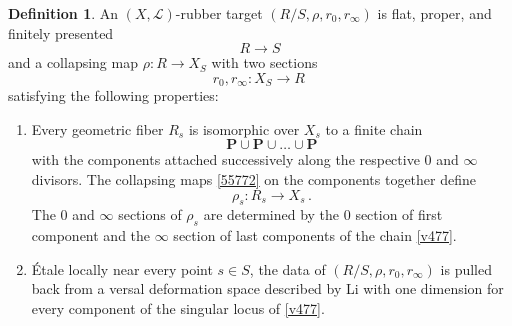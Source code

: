 \documentclass[a4paper,12pt]{article} %
\newcommand{\ca}[1]{{\mathcal{#1}}}
\theoremstyle{definition}
\newtheorem{definition}{Definition} %
\theoremstyle{plain}%
\begin{document}
\begin{definition}\label{def:rubber_target} An $(X,\ca L)$-rubber target $(R/S,\rho, r_0,r_\infty)$ is flat,
proper, and finitely presented
$$ R \to S$$
and a collapsing map $\rho: R \to X_S$
with two sections 
$$r_0,r_\infty: X_S \to R\, $$
satisfying the following properties:
\begin{enumerate}
    \item [(i)]
    Every geometric fiber  $R_s$ is isomorphic over $X_s$ to
    a finite chain  
    \begin{equation}\label{v477}
    \mathbf{P}\cup \mathbf{P} \cup \ldots \cup \mathbf{P}
    \end{equation}
    with the components attached successively along the respective
    $0$ and $\infty$ divisors. The collapsing maps \eqref{55772} on the
    components together define $$\rho_s: R_s \to X_s\,.$$
    The $0$ and $\infty$ sections of $\rho_s$ are determined
    by the $0$ section of first component  and the $\infty$ section of
    last components of the chain \eqref{v477}.
    \item[(ii)] \'Etale locally near every point $s\in S$, the data 
    of $(R/S,\rho, r_0,r_\infty)$ is pulled back from
    a versal deformation space described by Li \cite{Li2001-Stable}
    with one dimension for every component of the singular locus of \eqref{v477}. %
\end{enumerate}
\end{definition}
\end{document}
